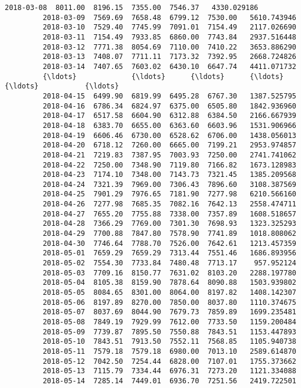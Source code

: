\documentclass[11pt]{article}
\begin{document}
\begin{Verbatim}[commandchars=\\\{\}]
         2018-03-08  8011.00  8196.15  7355.00  7546.37   4330.029186   
         2018-03-09  7569.69  7658.48  6799.12  7530.00   5610.743946   
         2018-03-10  7529.40  7745.99  7091.01  7154.49   2117.026690   
         2018-03-11  7154.49  7933.85  6860.00  7743.84   2937.516448   
         2018-03-12  7771.38  8054.69  7110.00  7410.22   3653.886290   
         2018-03-13  7408.07  7711.11  7173.32  7392.95   2668.724826   
         2018-03-14  7407.65  7603.02  6430.10  6647.74   4411.071732   
         {\ldots}             {\ldots}      {\ldots}      {\ldots}      {\ldots}           {\ldots}   
         2018-04-15  6499.90  6819.99  6495.28  6767.30   1387.525795   
         2018-04-16  6786.34  6824.97  6375.00  6505.80   1842.936960   
         2018-04-17  6517.58  6604.90  6312.88  6384.50   2166.667939   
         2018-04-18  6383.70  6655.00  6363.60  6603.96   1531.906966   
         2018-04-19  6606.46  6730.00  6528.62  6706.00   1438.056013   
         2018-04-20  6718.12  7260.00  6665.00  7199.21   2953.974857   
         2018-04-21  7219.83  7387.95  7003.93  7250.00   2741.741062   
         2018-04-22  7250.00  7348.90  7119.80  7166.82   1673.128983   
         2018-04-23  7174.10  7348.00  7143.73  7321.45   1385.209568   
         2018-04-24  7321.39  7969.00  7306.43  7896.60   3108.387569   
         2018-04-25  7901.29  7976.65  7181.90  7277.98   6210.566160   
         2018-04-26  7277.98  7685.35  7082.16  7642.13   2558.474711   
         2018-04-27  7655.20  7755.88  7338.00  7357.89   1608.518657   
         2018-04-28  7366.29  7769.00  7301.30  7698.93   1323.325293   
         2018-04-29  7700.88  7847.80  7578.90  7741.89   1018.808062   
         2018-04-30  7746.64  7788.70  7526.00  7642.61   1213.457359   
         2018-05-01  7659.29  7659.29  7313.44  7551.46   1686.893956   
         2018-05-02  7554.30  7733.84  7480.48  7713.17    957.952124   
         2018-05-03  7709.16  8150.77  7631.02  8103.20   2288.197780   
         2018-05-04  8105.38  8159.90  7878.64  8090.88   1503.939802   
         2018-05-05  8084.65  8301.00  8064.00  8197.82   1408.142307   
         2018-05-06  8197.89  8270.00  7850.00  8037.80   1110.374675   
         2018-05-07  8037.69  8044.90  7679.73  7859.89   1699.235481   
         2018-05-08  7849.19  7929.99  7612.00  7733.50   1159.200484   
         2018-05-09  7739.87  7895.50  7550.88  7843.51   1153.447893   
         2018-05-10  7843.51  7913.50  7552.11  7568.85   1105.940738   
         2018-05-11  7579.18  7579.18  6980.00  7013.10   2589.614870   
         2018-05-12  7042.50  7254.44  6828.00  7107.01   1755.373662   
         2018-05-13  7115.79  7334.44  6976.31  7273.20   1121.334088   
         2018-05-14  7285.14  7449.01  6936.70  7251.56   2419.722501   
         

\end{Verbatim}
\end{document}

